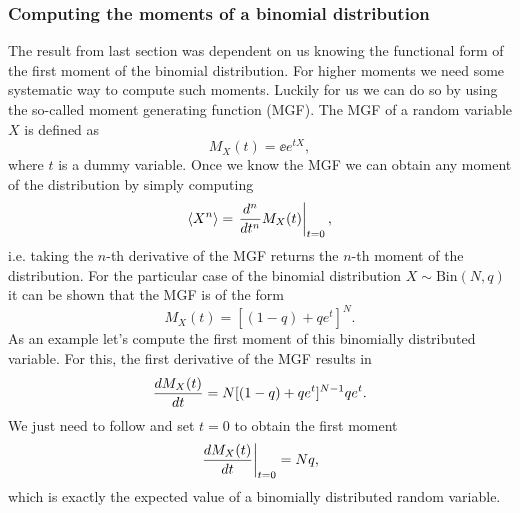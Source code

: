 \subsubsection{Computing the moments of a binomial distribution}

The result from last section was dependent on us knowing the functional form of
the first moment of the binomial distribution. For higher moments we need some
systematic way to compute such moments. Luckily for us we can do so by using
the so-called moment generating function (MGF). The MGF of a random variable
$X$ is defined as
\begin{equation}
M_X(t) = \ee{e^{tX}},
\end{equation}
where $t$ is a dummy variable. Once we know the MGF we can obtain any moment of
the distribution by simply computing
\begin{equation}
  \left\langle X^n \right\rangle = \left. {d^n \over dt^n} M_X(t) \right\vert_{t=0},
  \label{eq_mgf_def}
\end{equation}
i.e. taking the $n$-th derivative of the MGF returns the $n$-th moment of the
distribution. For the particular case of the binomial distribution $X \sim
\text{Bin}(N, q)$ it can be shown that the MGF is of the form
\begin{equation}
M_X(t) = \left[ (1 - q) + qe^{t} \right]^N.
\end{equation}
As an example let's compute the first moment of this binomially distributed
variable. For this, the first derivative of the MGF results in
\begin{equation}
  {d M_X(t) \over dt} = N [(1 - q) + qe^t]^{N - 1} q e^t.
\end{equation}
We just need to follow  and set $t = 0$ to obtain the first
moment
\begin{equation}
  \left. {d M_X(t) \over dt} \right\vert_{t=0} = N q,
  \label{eq_mgf_mean}
\end{equation}
which is exactly the expected value of a binomially distributed random
variable.

